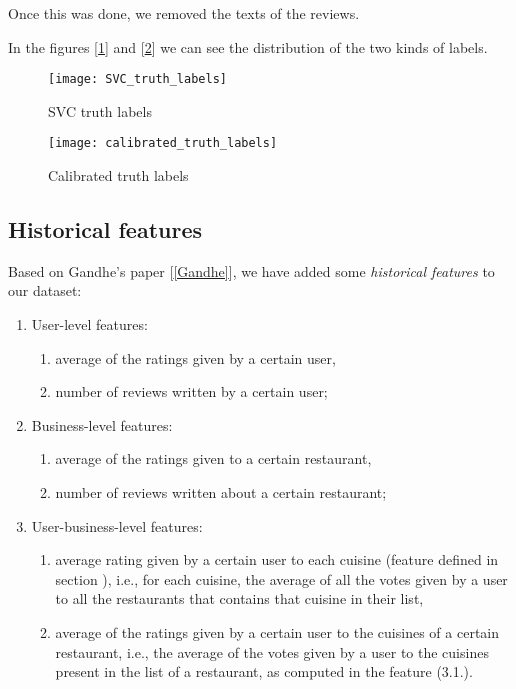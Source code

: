 Once this was done, we removed the texts of the reviews.

In the figures [\ref{fig:SVC-truth-labels}] and [\ref{fig:calibrated-truth-labels}] we can see the distribution of the two kinds of labels.

\begin{figure}[h!]
	\centering
	\texttt{[image: SVC\_truth\_labels]}
	\caption{SVC truth labels}
	\label{fig:SVC-truth-labels}
\end{figure}

\begin{figure}[h!]
	\centering
	\texttt{[image: calibrated\_truth\_labels]}
	\caption{Calibrated truth labels}
	\label{fig:calibrated-truth-labels}
\end{figure}


\subsection{Historical features}\label{sec:hist-feat}

Based on Gandhe's paper [\ref{Gandhe}], we have added some \textit{historical features} to our dataset:
\begin{enumerate}
	\item User-level features:
	\begin{enumerate}
		\item average of the ratings given by a certain user,
		\item number of reviews written by a certain user;
	\end{enumerate}
	\item Business-level features: 
	\begin{enumerate}
		\item average of the ratings given to a certain restaurant,
		\item number of reviews written about a certain restaurant;
	\end{enumerate}
	\item User-business-level features: 
	\begin{enumerate}
		\item average rating given by a certain user to each cuisine (feature defined in section ), i.e., for each cuisine, the average of all the votes given by a user to all the restaurants that contains that cuisine in their list,
		\item average of the ratings given by a certain user to the cuisines of a certain restaurant, i.e., the average of the votes given by a user to the cuisines present in the list of a restaurant, as computed in the feature (3.1.).
	\end{enumerate}
\end{enumerate}

